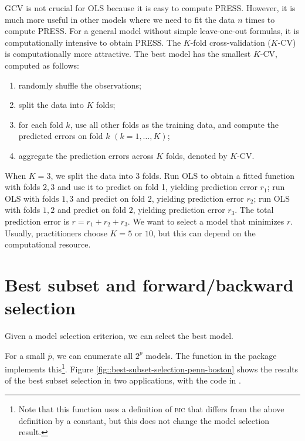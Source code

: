 GCV is not crucial for OLS because it is easy to compute PRESS.
However, it is much more useful in other models where
we need to fit the data $n$ times to compute PRESS. 
For a general model without simple leave-one-out formulas, it is computationally intensive to obtain PRESS. The
$K$-fold cross-validation ($K$-CV) is computationally more attractive. The best model has the smallest $K$-CV, computed as follows:
\begin{enumerate}
\item randomly shuffle the observations;
\item split the data into $K$ folds;
\item for each fold $k$, use all other folds as the training data, and
compute the predicted errors on fold $k$ $(k=1,\ldots, K)$;
\item aggregate the prediction errors across $K$ folds, denoted by $K$-CV.
\end{enumerate}

When $K  = 3$, we split the data into $3$ folds. Run OLS to obtain a fitted function with folds $2,3$ and use it to predict on fold 1, yielding prediction error $r_1$;  run OLS with folds $1,3$ and predict on fold $2$,  yielding prediction error $r_2$; run OLS with folds $1, 2$ and predict on fold $2$, yielding prediction error $r_3$. The total prediction error is $r = r_1  + r_2 + r_3$. We want to select a model that minimizes $r$. Usually, practitioners choose $K=5$ or $10$, but this can depend on the computational resource. 



\section{Best subset and forward/backward selection}

Given a model selection criterion, we can select the best model. 

For a small $\overline{p}$, we can enumerate all $2^{\overline{p}}$ models. The function  in the  package  implements this\footnote{Note that this function uses a definition of \textsc{bic} that differs from the above definition by a constant, but this does not change the model selection result.}.
Figure \ref{fig::best-subset-selection-penn-boston} shows the results of the best subset selection in two applications, with the code in .  


